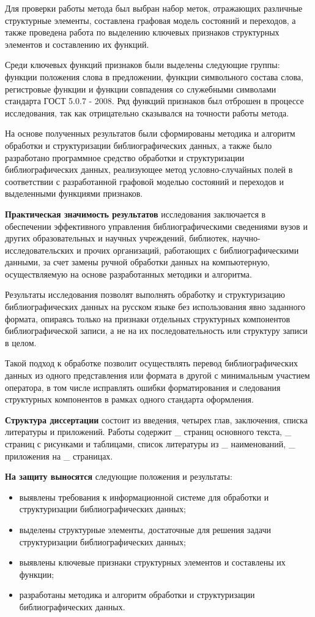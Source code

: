 Для проверки работы метода был выбран набор меток, отражающих различные структурные элементы, составлена графовая модель состояний и переходов, а также проведена работа по выделению ключевых признаков структурных элементов и составлению их функций.

Среди ключевых функций признаков были выделены следующие группы: функции положения слова в предложении, функции символьного состава слова, регистровые функции и функции совпадения со служебными символами стандарта ГОСТ 5.0.7 - 2008. Ряд функций признаков был отброшен в процессе исследования, так как отрицательно сказывался на точности работы метода.

На основе полученных результатов были сформированы методика и алгоритм обработки и структуризации библиографических данных, а также было разработано программное средство обработки и структуризации библиографических данных, реализующее метод условно-случайных полей в соответствии с разработанной графовой моделью состояний и переходов и выделенными функциями признаков.

\textbf{Практическая значимость результатов} исследования заключается в обеспечении эффективного управления библиографическими сведениями вузов и других образовательных и научных учреждений, библиотек, научно-исследовательских и прочих организаций, работающих с библиографическими данными, за счет замены ручной обработки данных на компьютерную, осуществляемую на основе разработанных методики и алгоритма.

Результаты исследования позволят выполнять обработку и структуризацию библиографических данных на русском языке без использования явно заданного формата, опираясь только на признаки отдельных структурных компонентов библиографической записи, а не на их последовательность или структуру записи в целом.

Такой подход к обработке позволит осуществлять перевод библиографических данных из одного представления или формата в другой с минимальным участием оператора, в том числе исправлять ошибки форматирования и следования структурных компонентов в рамках одного стандарта оформления.

\textbf{Структура диссертации} состоит из введения, четырех глав, заключения, списка литературы и приложений. Работы содержит \_ страниц основного текста, \_ страниц с рисунками и таблицами, список литературы из \_ наименований, \_ приложения на \_ страницах.

\textbf{На защиту выносятся} следующие положения и результаты:
\begin{itemize}
	\item выявлены требования к информационной системе для обработки и структуризации библиографических данных;
	\item выделены структурные элементы, достаточные для решения задачи структуризации библиографических данных;
	\item выявлены ключевые признаки структурных элементов и составлены их функции;
	\item разработаны методика и алгоритм обработки и структуризации библиографических данных.
\end{itemize}
